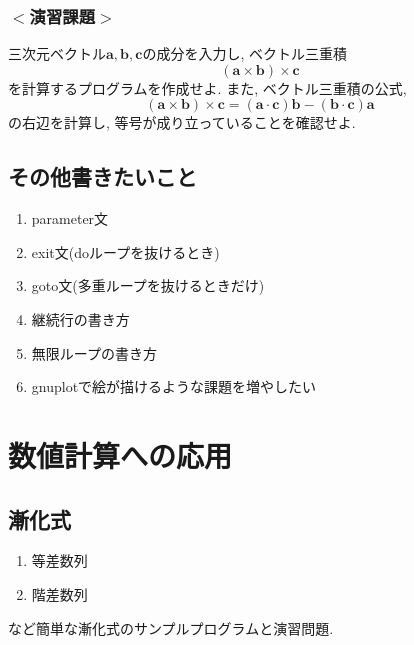 \documentclass[a4j]{jsbook}
\begin{document}
\subsection*{$<$演習課題$>$}
三次元ベクトル$\bm{a}, \bm{b}, \bm{c}$の成分を入力し, ベクトル三重積
\begin{equation}
(\bm{a} \times \bm{b}) \times \bm{c}
\end{equation}
を計算するプログラムを作成せよ.
また, ベクトル三重積の公式,
\begin{equation}
(\bm{a} \times \bm{b}) \times \bm{c} = (\bm{a} \cdot \bm{c})\bm{b} - (\bm{b} \cdot \bm{c})\bm{a}
\end{equation}
の右辺を計算し, 等号が成り立っていることを確認せよ.
%

%
%
%


\section*{その他書きたいこと}
\begin{enumerate}
\item parameter文
\item exit文(doループを抜けるとき)
\item goto文(多重ループを抜けるときだけ)
\item 継続行の書き方
\item 無限ループの書き方
\item gnuplotで絵が描けるような課題を増やしたい
\end{enumerate}

\chapter{数値計算への応用}
\section{漸化式}
\begin{enumerate}
\item 等差数列
\item 階差数列
\end{enumerate}
など簡単な漸化式のサンプルプログラムと演習問題.
\end{document}
